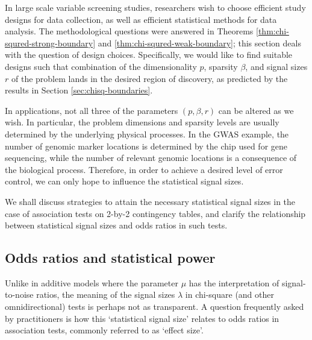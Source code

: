
In large scale variable screening studies, researchers wish to choose efficient study designs for data collection, as well as efficient statistical methods for data analysis.
The methodological questions were answered in Theorems \ref{thm:chi-squred-strong-boundary} and \ref{thm:chi-squred-weak-boundary}; this section deals with the question of design choices.
Specifically, we would like to find suitable designs such that combination of the dimensionality $p$, sparsity $\beta$, and signal sizes $r$ of the problem lands in the desired region of discovery, as predicted by the results in Section \ref{sec:chisq-boundaries}.

In applications, not all three of the parameters $(p, \beta, r)$ can be altered as we wish.
In particular, the problem dimensions and sparsity levels are usually determined by the underlying physical processes.
In the GWAS example, the number of genomic marker locations is determined by the chip used for gene sequencing, while the number of relevant genomic locations is a consequence of the biological process.
Therefore, in order to achieve a desired level of error control, we can only hope to influence the statistical signal sizes.

We shall discuss strategies to attain the necessary statistical signal sizes in the case of association tests on 2-by-2 contingency tables, and clarify the relationship between statistical signal sizes and odds ratios in such tests.

\subsection{Odds ratios and statistical power}
\label{subsec:odds-and-power}

Unlike in additive models where the parameter $\mu$ has the interpretation of signal-to-noise ratios, the meaning of the signal sizes $\lambda$ in chi-square (and other omnidirectional) tests is perhaps not as transparent.
A question frequently asked by practitioners is how this `statistical signal size' relates to odds ratios in association tests, commonly referred to as `effect size'.

